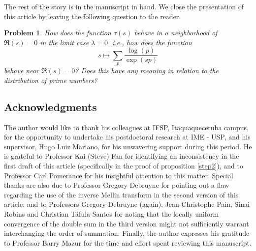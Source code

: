 \documentclass[11pt]{amsart}
\newtheorem{problem}[theorem]{Problem}
\numberwithin{equation}{section}
\newcommand{\disum}{\displaystyle \sum}
\newcommand{\difrac}{\displaystyle \frac}
\begin{document}
The rest of the story is in the manuscript in hand. We close the presentation of this article by leaving the following question to the reader.

\begin{problem}

How does the function $\tau(s)$ behave in a neighborhood of $\Re(s) = 0$ in the limit case $\lambda = 0$, i.e., how does the function $$s \mapsto \disum_p \difrac{\log(p)}{\exp(sp)}$$ behave near $\Re(s) = 0$? Does this have any meaning in relation to the distribution of prime numbers?

\end{problem}

\subsection*{Acknowledgments}

The author would like to thank his colleagues at IFSP, Itaquaquecetuba campus, for the opportunity to undertake his postdoctoral research at IME - USP, and his supervisor, Hugo Luiz Mariano, for his unwavering support during this period. He is grateful to Professor Kai (Steve) Fan for identifying an inconsistency in the first draft of this article (specifically in the proof of proposition \ref{step2}), and to Professor Carl Pomerance for his insightful attention to this matter. Special thanks are also due to Professor Gregory Debruyne for pointing out a flaw regarding the use of the inverse Mellin transform in the second version of this article, and to Professors Gregory Debruyne (again), Jean-Christophe Pain, Sinai Robins and Christian T\'afula Santos for noting that the locally uniform convergence of the double sum in the third version might not sufficiently warrant interchanging the order of summation. Finally, the author expresses his gratitude to Professor Barry Mazur for the time and effort spent reviewing this manuscript.
\end{document}
